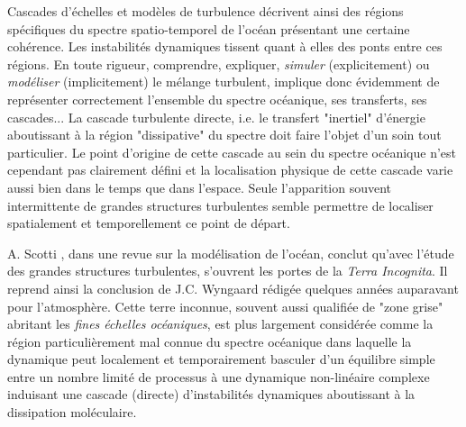 Cascades d'échelles et modèles de turbulence décrivent ainsi des régions spécifiques du spectre spatio-temporel de l'océan présentant une certaine cohérence. Les instabilités dynamiques tissent quant à elles des ponts entre ces régions. En toute rigueur, comprendre, expliquer, \textit{simuler} (explicitement) ou \textit{modéliser} (implicitement) le mélange turbulent, implique donc évidemment de représenter correctement l'ensemble du spectre océanique, ses transferts, ses cascades... La cascade turbulente directe, i.e. le transfert "inertiel" d'énergie aboutissant à la région "dissipative" du spectre doit faire l'objet d'un soin tout particulier. Le point d'origine de cette cascade au sein du spectre océanique n'est cependant pas clairement défini et la localisation physique de cette cascade varie aussi bien dans le temps que dans l'espace. Seule l'apparition souvent intermittente de grandes structures turbulentes semble permettre de localiser spatialement et temporellement ce point de départ.

A. Scotti \citep{scotti_large_2010}, dans une revue sur la modélisation de l'océan, conclut qu’avec l'étude des grandes structures turbulentes, s'ouvrent les portes de la \textit{Terra Incognita}. Il reprend ainsi la conclusion de J.C. Wyngaard \citep{wyngaard_toward_2004} rédigée quelques années auparavant pour l'atmosphère. Cette terre inconnue, souvent aussi qualifiée de "zone grise" abritant les \textit{fines échelles océaniques}, est plus largement considérée comme la région particulièrement mal connue du spectre océanique dans laquelle la dynamique peut localement et temporairement basculer d'un équilibre simple entre un nombre limité de processus à une dynamique non-linéaire complexe induisant une cascade (directe) d'instabilités dynamiques aboutissant à la dissipation moléculaire. 
\color{black}
